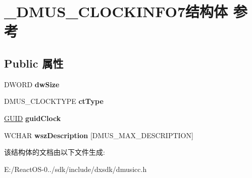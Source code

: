 \hypertarget{struct___d_m_u_s___c_l_o_c_k_i_n_f_o7}{}\section{\+\_\+\+D\+M\+U\+S\+\_\+\+C\+L\+O\+C\+K\+I\+N\+F\+O7结构体 参考}
\label{struct___d_m_u_s___c_l_o_c_k_i_n_f_o7}
\subsection*{Public 属性}
\begin{DoxyCompactItemize}
\item 
\mbox{\label{struct___d_m_u_s___c_l_o_c_k_i_n_f_o7_ada8b1db2ebee3efba93ae8ef99197960}} 
D\+W\+O\+RD {\bfseries dw\+Size}
\item 
\mbox{\label{struct___d_m_u_s___c_l_o_c_k_i_n_f_o7_a0d78d922244e39d837862e725257e3b6}} 
D\+M\+U\+S\+\_\+\+C\+L\+O\+C\+K\+T\+Y\+PE {\bfseries ct\+Type}
\item 
\mbox{\label{struct___d_m_u_s___c_l_o_c_k_i_n_f_o7_a18fe05cf20bb63eb3885194833882f7e}} 
\hyperlink{interface_g_u_i_d}{G\+U\+ID} {\bfseries guid\+Clock}
\item 
\mbox{\label{struct___d_m_u_s___c_l_o_c_k_i_n_f_o7_a125a9faf5fc86ab0387987214127a90e}} 
W\+C\+H\+AR {\bfseries wsz\+Description} \mbox{[}D\+M\+U\+S\+\_\+\+M\+A\+X\+\_\+\+D\+E\+S\+C\+R\+I\+P\+T\+I\+ON\mbox{]}
\end{DoxyCompactItemize}


该结构体的文档由以下文件生成\+:\begin{DoxyCompactItemize}
\item 
E\+:/\+React\+O\+S-\/0../sdk/include/dxsdk/dmusicc.\+h\end{DoxyCompactItemize}

